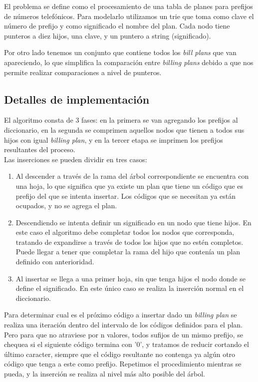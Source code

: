 El problema se define como el procesamiento de una tabla de planes para
prefijos de números telefónicos. Para modelarlo utilizamos un trie que
toma como clave el número de prefijo y como significado el nombre del
plan. Cada nodo tiene punteros a diez hijos, una clave, y un puntero a string
(significado).

Por otro lado tenemos un conjunto que contiene todos los {\sl bill plans}
que van apareciendo, lo que simplifica la comparación entre {\sl billing
plans} debido a que nos permite realizar comparaciones a nivel de punteros.

\subsection*{Detalles de implementación}

El algoritmo consta de 3 fases: en la primera se van agregando los prefijos
al diccionario, en la segunda se comprimen aquellos nodos que tienen a todos sus
hijos con igual {\sl billing plan}, y en la tercer etapa se imprimen los prefijos
resultantes del proceso.\\

Las inserciones se pueden dividir en tres casos:

\begin{enumerate}
  \item Al descender a través de la rama del árbol correspondiente se
  encuentra con una hoja, lo que significa que ya existe un plan que tiene
  un código que es prefijo del que se intenta insertar. Los códigos que se
  necesitan ya están ocupados, y no se agrega el plan.

  \item Descendiendo se intenta definir un significado en un nodo que
  tiene hijos. En este caso el algoritmo debe completar todos los nodos que
  corresponda, tratando de expandirse a través de todos los hijos que no
  estén completos. Puede llegar a tener que completar la rama del hijo que
  contenía un plan definido con anterioridad.

  \item Al insertar se llega a una primer hoja, sin que tenga hijos el nodo
  donde se define el significado. En este único caso se realiza la inserción
  normal en el diccionario.
\end{enumerate}

Para determinar cual es el próximo código a insertar dado un {\sl billing
plan} se realiza una iteración dentro del intervalo de los códigos definidos
para el plan. Pero para que no atraviese por n valores, todos sufijos de un
mismo prefijo, se chequea si el siguiente código termina con '0', y tratamos
de reducir cortando el último caracter, siempre que el código resultante
no contenga ya algún otro código que tenga a este como prefijo. Repetimos
el procedimiento mientras se pueda, y la inserción se realiza al nivel más
alto posible del árbol.

